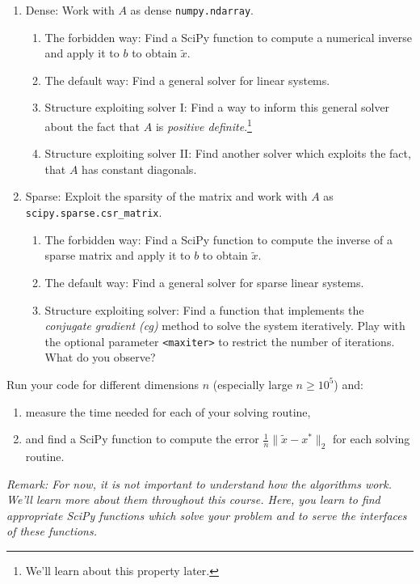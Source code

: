 \begin{enumerate}


\item Dense: Work with $A$ as dense \texttt{numpy.ndarray}.
\begin{enumerate}
	\item The forbidden way: Find a SciPy function to compute a numerical inverse and apply it to $b$ to obtain $\tilde{x}$.
	\item The default way: Find a general solver for linear systems.
	\item Structure exploiting solver I: Find a way to inform this general solver about the fact that $A$ is \textit{positive definite}.\footnote{We'll learn about this property later.} 
	\item Structure exploiting solver II: Find another solver which exploits the fact, that $A$ has constant diagonals.
\end{enumerate}
\item Sparse: Exploit the sparsity of the matrix and work with $A$ as  \texttt{scipy.sparse.csr\_matrix}.
\begin{enumerate}
	\item The forbidden way: Find a SciPy function to compute the inverse of a sparse matrix and apply it to $b$ to obtain $\tilde{x}$.
	\item The default way: Find a general solver for sparse linear systems.
	\item Structure exploiting solver: Find a function that implements the \textit{conjugate gradient (cg)} method to solve the system iteratively. Play with the optional parameter \texttt{<maxiter>} to restrict the number of iterations. What do you observe?
\end{enumerate}

\end{enumerate}

Run your code for different dimensions $n$ (especially large $n\geq 10^5$) and:
\begin{enumerate}
	\item measure the time needed for each of your solving routine,
	\item and find a SciPy function to compute the error $\frac{1}{n} \|\tilde{x}-x^*\|_2$  for each solving routine.
\end{enumerate}


\textit{Remark: For now, it is not important to understand how the algorithms work. We'll learn more about them throughout this course. Here, you learn to find appropriate SciPy functions which solve your problem and to serve the interfaces of these functions.}
